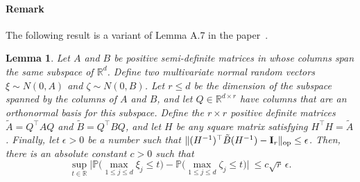 \documentclass[aos,preprint]{imsart}
\numberwithin{equation}{section}
\theoremstyle{plain}
\newtheorem{lemma}{Lemma}[section]
\newcommand{\R}{\mathbb{R}}
\renewcommand{\P}{\mathbb{P}}
\newcommand{\e}{\epsilon}
\newcommand{\ttop}{^{\top}}
\newcommand{\op}{_{\textup{op}}}
\newcommand{\1}{{\bf{1}}}
\newcommand{\0}{\mathbf{0}}
\begin{document}
\paragraph{Remark} The following result is a variant of Lemma A.7 in the paper~\citep{Zhilova:2015}.
\begin{lemma}\label{lem:hellinger}
Let $A$ and $B$ be positive semi-definite matrices in \smash{$\R^{d\times d}\setminus\{0\}$} whose columns span the same subspace of $\R^d$.
Define two multivariate normal random vectors $\xi\sim N(0, A)$ and $\zeta\sim N(0,B)$. 
Let $r\leq d$ be the dimension of the subspace spanned by the columns of $A$ and $B$, and let $Q\in\R^{d\times r}$ have columns that are an orthonormal basis for this subspace. Define the $r\times r$ positive definite matrices $\tilde A=Q\ttop A Q$ and $\tilde B=Q\ttop B Q$, and let $H$ be any square matrix satisfying $H\ttop H=\tilde A$. Finally, let $\e>0$ be a number such that $\|(H^{-1})\ttop \tilde B (H^{-1}) -\mathbf{I}_r\|\op \leq \e$. Then, there is an absolute constant $c>0$ such that
%
\begin{equation}\label{hellenger}
 \sup_{t\in\R}\bigg|\P\Big(\max_{1\leq j\leq d} \xi_j\leq t\Big)-\P\Big(\max_{1\leq j\leq d} \zeta_j\leq t\Big)\bigg| \ \leq  c\sqrt{r}\, \e.
\end{equation}
\end{lemma}
\end{document}

